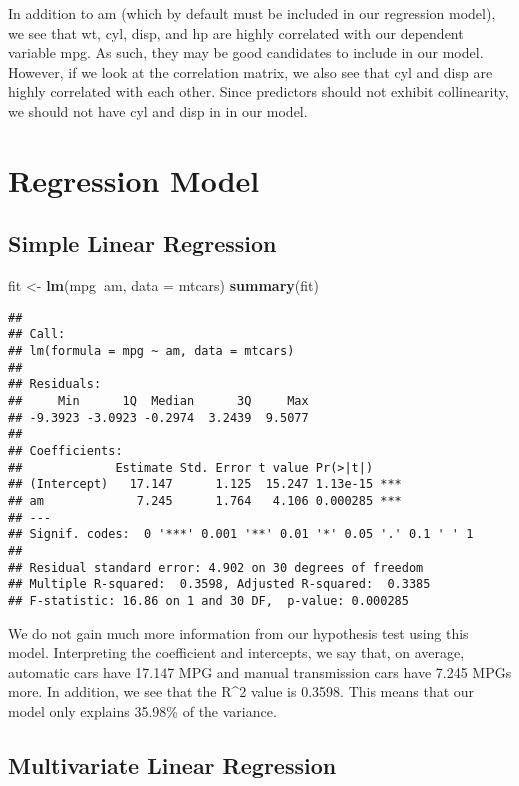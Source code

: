 \documentclass[]{article}
\newenvironment{Shaded}{\begin{snugshade}}{\end{snugshade}}
\newcommand{\KeywordTok}[1]{\textcolor[rgb]{0.13,0.29,0.53}{\textbf{#1}}}
\newcommand{\DataTypeTok}[1]{\textcolor[rgb]{0.13,0.29,0.53}{#1}}
\newcommand{\StringTok}[1]{\textcolor[rgb]{0.31,0.60,0.02}{#1}}
\newcommand{\OperatorTok}[1]{\textcolor[rgb]{0.81,0.36,0.00}{\textbf{#1}}}
\newcommand{\NormalTok}[1]{#1}
\begin{document}
In addition to am (which by default must be included in our regression
model), we see that wt, cyl, disp, and hp are highly correlated with our
dependent variable mpg. As such, they may be good candidates to include
in our model. However, if we look at the correlation matrix, we also see
that cyl and disp are highly correlated with each other. Since
predictors should not exhibit collinearity, we should not have cyl and
disp in in our model.

\section{Regression Model}\label{regression-model}

\subsection{Simple Linear Regression}\label{simple-linear-regression}

\begin{Shaded}
\begin{Highlighting}[]
\NormalTok{fit <-}\StringTok{ }\KeywordTok{lm}\NormalTok{(mpg}\OperatorTok{~}\NormalTok{am, }\DataTypeTok{data =}\NormalTok{ mtcars)}
\KeywordTok{summary}\NormalTok{(fit)}
\end{Highlighting}
\end{Shaded}

\begin{verbatim}
## 
## Call:
## lm(formula = mpg ~ am, data = mtcars)
## 
## Residuals:
##     Min      1Q  Median      3Q     Max 
## -9.3923 -3.0923 -0.2974  3.2439  9.5077 
## 
## Coefficients:
##             Estimate Std. Error t value Pr(>|t|)    
## (Intercept)   17.147      1.125  15.247 1.13e-15 ***
## am             7.245      1.764   4.106 0.000285 ***
## ---
## Signif. codes:  0 '***' 0.001 '**' 0.01 '*' 0.05 '.' 0.1 ' ' 1
## 
## Residual standard error: 4.902 on 30 degrees of freedom
## Multiple R-squared:  0.3598, Adjusted R-squared:  0.3385 
## F-statistic: 16.86 on 1 and 30 DF,  p-value: 0.000285
\end{verbatim}

We do not gain much more information from our hypothesis test using this
model. Interpreting the coefficient and intercepts, we say that, on
average, automatic cars have 17.147 MPG and manual transmission cars
have 7.245 MPGs more. In addition, we see that the R\^{}2 value is
0.3598. This means that our model only explains 35.98\% of the variance.

\subsection{Multivariate Linear
Regression}\label{multivariate-linear-regression}
\end{document}
